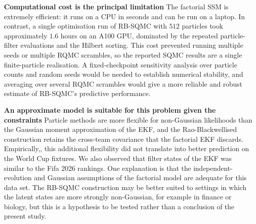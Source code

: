 \textbf{Computational cost is the principal limitation} The factorial SSM is extremely efficient: it runs on a CPU in seconds and can be run on a laptop. In contrast, a single optimisation run of RB-SQMC with $512$ particles took approximately $1.6$ hours on an A100 GPU, dominated by the repeated particle-filter evaluations and the Hilbert sorting. This cost prevented running multiple seeds or multiple RQMC scrambles, so the reported SQMC results are a single finite-particle realisation. A fixed-checkpoint sensitivity analysis over particle counts and random seeds would be needed to establish numerical stability, and averaging over several RQMC scrambles would give a more reliable and robust estimate of RB-SQMC's predictive performance. 


\textbf{An approximate model is suitable for this problem given the constraints} Particle methods are more flexible for non-Gaussian likelihoods than the Gaussian moment approximation of the EKF, and the Rao-Blackwellised construction retains the cross-team covariance that the factorial EKF discards. Empirically,, this additional flexibility did not translate into better prediction on the World Cup fixtures. We also observed that filter states of the EKF was similar to the Fifa 2026 rankings. One explanation is that the independent-evolution and Gaussian assumptions of the factorial model are adequate for this data set. The RB-SQMC construction may be better suited to settings in which the latent states are more strongly non-Gaussian, for example in finance or biology, but this is a hypothesis to be tested rather than a conclusion of the present study.